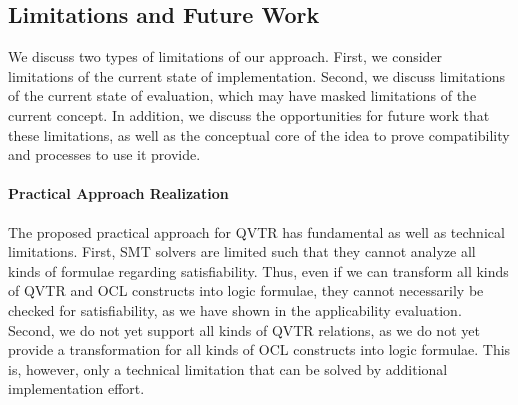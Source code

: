\subsection{Limitations and Future Work}

We discuss two types of limitations of our approach.
First, we consider limitations of the current state of implementation.
Second, we discuss limitations of the current state of evaluation, which may have masked limitations of the current concept.
In addition, we discuss the opportunities for future work that these limitations, as well as the conceptual core of the idea to prove compatibility and processes to use it provide.


\paragraph{Practical Approach Realization}
The proposed practical approach for \gls{QVTR} has fundamental as well as technical limitations.
First, \gls{SMT} solvers are limited such that they cannot analyze all kinds of formulae regarding satisfiability.
Thus, even if we can transform all kinds of \gls{QVTR} and \gls{OCL} constructs into logic formulae, they cannot necessarily be checked for satisfiability, as we have shown in the applicability evaluation.
Second, we do not yet support all kinds of \gls{QVTR} relations, as we do not yet provide a transformation for all kinds of \gls{OCL} constructs into logic formulae.
This is, however, only a technical limitation that can be solved by additional implementation effort.

